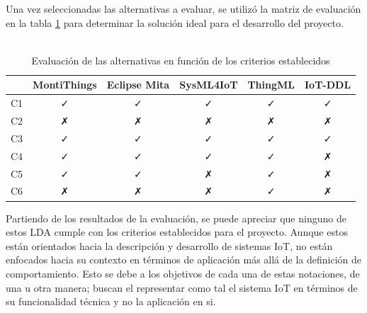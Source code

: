Una vez seleccionadas las alternativas a evaluar, se utilizó la matriz de evaluación en la tabla \ref{tab:evaluation} para determinar la solución ideal para el desarrollo del proyecto.

\skipline
\skipline
\skipline
\skipline

\begin{table}[H]
	\centering
	\caption{\\Evaluación de las alternativas en función de los criterios establecidos} \label{tab:evaluation}
	\begin{tabular}{cccccc}
		\hline
		\multicolumn{1}{l}{}             &
		\multicolumn{1}{l}{MontiThings}  &
		\multicolumn{1}{l}{Eclipse Mita} &
		\multicolumn{1}{l}{SysML4IoT}    &
		\multicolumn{1}{l}{ThingML}      &
		\multicolumn{1}{l}{IoT-DDL}                          \\ \hline
		C1                               & ✓ & ✓ & ✓ & ✓ & ✓ \\
		C2                               & ✗ & ✗ & ✗ & ✗ & ✗ \\
		C3                               & ✓ & ✓ & ✓ & ✓ & ✓ \\
		C4                               & ✓ & ✓ & ✓ & ✓ & ✗ \\
		C5                               & ✓ & ✓ & ✗ & ✓ & ✗ \\
		C6                               & ✗ & ✗ & ✗ & ✓ & ✗ \\ \hline
	\end{tabular}
\end{table}

Partiendo de los resultados de la evaluación, se puede apreciar que ninguno de estos LDA cumple con los criterios establecidos para el proyecto. Aunque estos están orientados hacia la descripción y desarrollo de sistemas IoT, no están enfocados hacia su contexto en términos de aplicación más allá de la definición de comportamiento. Esto se debe a los objetivos de cada una de estas notaciones, de una u otra manera; buscan el representar como tal el sistema IoT en términos de su funcionalidad técnica y no la aplicación en si.
